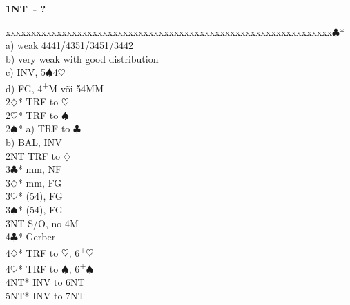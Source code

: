 \documentclass[10pt]{article}
\renewcommand{\c}{$\clubsuit$}
\renewcommand{\d}{$\diamondsuit$}
\newcommand{\h}{$\heartsuit$}
\newcommand{\s}{$\spadesuit$}
\newcommand{\p}{\textsuperscript{+}}
\newenvironment{bidtable}[1][]
{\textbf{#1}
  \begin{adjustwidth}{1em}{}
    \addvspace{2pt}
    \begin{tabbing}
      xxxxxxxx\=xxxxxxxx\=xxxxxxxx\=xxxxxxxx\=xxxxxxxx\=xxxxxxx\=xxxxxxxxx\=xxxxxxxx\=\kill}
{\end{tabbing}\end{adjustwidth}\bigskip}%
\begin{document}
\begin{bidtable}[1NT\ - ?]
2\c*   \> a) weak 4441/4351/3451/3442         \\
       \> b) very weak with good distribution \\
       \> c) INV, 5\s 4\h                     \\
       \> d) FG, 4\p M või 54MM               \\
2\d*   \> TRF to \h                           \\
2\h*   \> TRF to \s                           \\
2\s*   \> a) TRF to \c                        \\
       \> b) BAL, INV                         \\
2NT    \> TRF to \d                           \\
3\c*   {} mm, NF                           \\
3\d*   {} mm, FG                           \\
3\h*   {}(54), FG                          \\
3\s*   {}(54), FG                          \\
3NT    \> S/O, no 4M                          \\
4\c*   \> Gerber                              \\
4\d*   \> TRF to \h, 6\p\h                    \\
4\h*   \> TRF to \s, 6\p\s                    \\
4NT*   \> INV to 6NT                          \\
5NT*   \> INV to 7NT                          \\
\end{bidtable}
\end{document}
